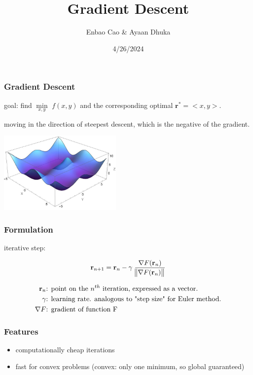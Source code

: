 \documentclass{beamer}
\title{Gradient Descent}
\author{Enbao Cao \& Ayaan Dhuka}
\institute{Multivariable Calculus}
\date{4/26/2024}
\begin{document}
\frame{\titlepage}

\begin{frame}
\frametitle{Gradient Descent}

goal: find $\underset{x, y}{\min}$ $f(x,y)$ and the corresponding optimal $\textbf{r}^*=<x,y>$. 

\vspace{0.2cm}
moving in the direction of steepest descent, which is the negative of the gradient.

\vspace{0.2cm}

    \begin{center}
    \includegraphics[width=6cm]{example}
    \end{center}
\end{frame}

\begin{frame}
\frametitle{Formulation}


iterative step:

$$\textbf{r}_{n+1}=\textbf{r}_{n}-\gamma \hspace{0.1cm} \frac{\nabla F(\textbf {r}_n)}{\norm{\nabla F(\textbf{r}_n)}}$$

\begin{align*}
    \textbf{r}_n& \textnormal{: point on the }n^{th}  \textnormal{ iteration, expressed as a vector.}\\
    \gamma& \textnormal{: learning rate. analogous to "step size" for Euler method.}\\
    \nabla F& \textnormal{: gradient of function F}
\end{align*}

\end{frame}


\begin{frame}
\frametitle{Features}

\begin{itemize}
    \item computationally cheap iterations
    \item fast for convex problems (convex: only one minimum, so global guaranteed)
\end{itemize}

\end{frame}
\end{document}

